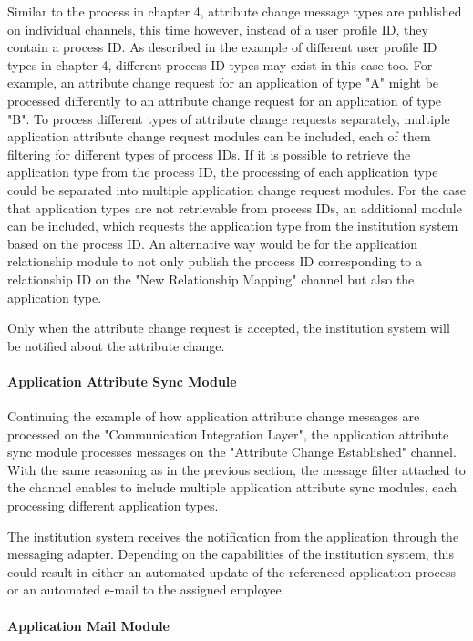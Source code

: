 Similar to the process in chapter 4, attribute change message types are published on individual channels, this time however, instead of a user profile ID, they contain a process ID. As described in the example of different user profile ID types in chapter 4, different process ID types may exist in this case too. For example, an attribute change request for an application of type "A" might be processed differently to an attribute change request for an application of type "B". To process different types of attribute change requests separately, multiple application attribute change request modules can be included, each of them filtering for different types of process IDs. If it is possible to retrieve the application type from the process ID, the processing of each application type could be separated into multiple application change request modules. For the case that application types are not retrievable from process IDs, an additional module can be included, which requests the application type from the institution system based on the process ID. An alternative way would be for the application relationship module to not only publish the process ID corresponding to a relationship ID on the "New Relationship Mapping" channel but also the application type.

Only when the attribute change request is accepted, the institution system will be notified about the attribute change.

\paragraph{Application Attribute Sync Module}

Continuing the example of how application attribute change messages are processed on the "Communication Integration Layer", the application attribute sync module processes messages on the "Attribute Change Established" channel. With the same reasoning as in the previous section, the message filter attached to the channel enables to include multiple application attribute sync modules, each processing different application types.

The institution system receives the notification from the application through the messaging adapter. Depending on the capabilities of the institution system, this could result in either an automated update of the referenced application process or an automated e-mail to the assigned employee.

\paragraph{Application Mail Module}

